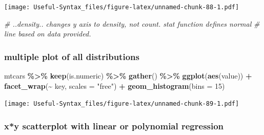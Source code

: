 \documentclass[
]{article}
\newenvironment{Shaded}{\begin{snugshade}}{\end{snugshade}}
\newcommand{\AttributeTok}[1]{\textcolor[rgb]{0.13,0.29,0.53}{#1}}
\newcommand{\CommentTok}[1]{\textcolor[rgb]{0.56,0.35,0.01}{\textit{#1}}}
\newcommand{\DecValTok}[1]{\textcolor[rgb]{0.00,0.00,0.81}{#1}}
\newcommand{\FunctionTok}[1]{\textcolor[rgb]{0.13,0.29,0.53}{\textbf{#1}}}
\newcommand{\NormalTok}[1]{#1}
\newcommand{\SpecialCharTok}[1]{\textcolor[rgb]{0.81,0.36,0.00}{\textbf{#1}}}
\newcommand{\StringTok}[1]{\textcolor[rgb]{0.31,0.60,0.02}{#1}}
\begin{document}
\texttt{[image: Useful-Syntax\_files/figure-latex/unnamed-chunk-88-1.pdf]}

\begin{Shaded}
\begin{Highlighting}[]
\CommentTok{\# ..density.. changes y axis to density, not count. stat function defines normal}
\CommentTok{\# line based on data provided.}
\end{Highlighting}
\end{Shaded}

\hypertarget{multiple-plot-of-all-distributions}{%
\subsubsection{multiple plot of all distributions}\label{multiple-plot-of-all-distributions}}

\begin{Shaded}
\begin{Highlighting}[]
\NormalTok{mtcars }\SpecialCharTok{\%\textgreater{}\%} \FunctionTok{keep}\NormalTok{(is.numeric) }\SpecialCharTok{\%\textgreater{}\%} \FunctionTok{gather}\NormalTok{() }\SpecialCharTok{\%\textgreater{}\%} \FunctionTok{ggplot}\NormalTok{(}\FunctionTok{aes}\NormalTok{(value)) }\SpecialCharTok{+}
  \FunctionTok{facet\_wrap}\NormalTok{(}\SpecialCharTok{\textasciitilde{}}\NormalTok{ key, }\AttributeTok{scales =} \StringTok{"free"}\NormalTok{) }\SpecialCharTok{+} \FunctionTok{geom\_histogram}\NormalTok{(}\AttributeTok{bins =} \DecValTok{15}\NormalTok{)}
\end{Highlighting}
\end{Shaded}

\texttt{[image: Useful-Syntax\_files/figure-latex/unnamed-chunk-89-1.pdf]}

\hypertarget{xy-scatterplot-with-linear-or-polynomial-regression}{%
\subsubsection{x*y scatterplot with linear or polynomial regression}\label{xy-scatterplot-with-linear-or-polynomial-regression}}
\end{document}
